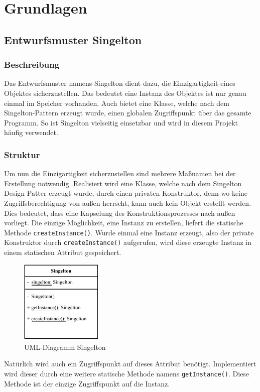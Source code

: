 \section{Grundlagen}\label{sec:grundlagen}
\subsection{Entwurfsmuster Singelton}\label{subsec:entwurdsmuster-singelton}
\subsubsection{Beschreibung}
Das Entwurfsmuster namens Singelton dient dazu, die Einzigartigkeit eines Objektes sicherzustellen.
Das bedeutet eine Instanz des Objektes ist nur genau einmal im Speicher vorhanden.
Auch bietet eine Klasse, welche nach dem Singelton-Pattern erzeugt wurde, einen globalen Zugriffspunkt über das gesamte Programm.
So ist Singelton vielseitig einsetzbar und wird in diesem Projekt häufig verwendet.
\subsubsection{Struktur}
Um nun die Einzigartigkeit sicherzustellen sind mehrere Maßnamen bei der Erstellung notwendig.
Realisiert wird eine Klasse, welche nach dem Singelton Design-Patter erzeugt wurde, durch einen privaten Konstruktor, denn wo keine Zugriffsberechtigung von außen herrscht, kann auch kein Objekt erstellt werden.
Dies bedeutet, dass eine Kapselung des Konstruktionsprozesses nach außen vorliegt.
Die einzige Möglichkeit, eine Instanz zu erstellen, liefert die statische Methode \lstinline{createInstance()}.
Wurde einmal eine Instanz erzeugt, also der private Konstruktor durch \lstinline{createInstance()} aufgerufen, wird diese erzeugte Instanz in einem statischen Attribut gespeichert.\\
\begin{figure}[H]
    \centering
    \includegraphics[width=0.35\textwidth]{fig/ainf/Singelton.pdf}
    \caption{UML-Diagramm Singelton}
\end{figure}
Natürlich wird auch ein Zugriffspunkt auf dieses Attribut benötigt.
Implementiert wird dieser durch eine weitere statische Methode namens \lstinline{getInstance()}.
Diese Methode ist der einzige Zugriffspunkt auf die Instanz.
